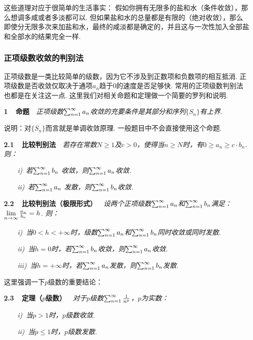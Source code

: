 这些道理对应于很简单的生活事实：
假如你拥有无限多的盐和水（条件收敛），那么想调多咸或者多淡都可以.
但如果盐和水的总量都是有限的（绝对收敛），那么即使分无限多次来加盐和水，最终的咸淡都是确定的，并且这与一次性加入全部盐和全部水的结果完全一样.

\subsubsection{正项级数收敛的判别法}

正项级数是一类比较简单的级数，因为它不涉及到正数项和负数项的相互抵消.
正项级数是否收敛仅取决于通项$a_n$趋于$0$的速度是否足够快.
常用的正项级数判别法也都是在关注这一点.
这里我们对相关命题和定理做一个简要的罗列和说明.\vspace{1em}

\textbf{1~~命题}~~\textit{正项级数$\ss a_n$收敛的充要条件是其部分和序列$\{ S_n \}$有上界.}\vspace{0.5em}

说明：对$\{ S_n \}$而言就是单调收敛原理. 一般题目中不会直接使用这个命题.    \vspace{1em}

\textbf{2.1~~比较判别法}~~\textit{若存在常数$N \ge 1$及$c > 0$，使得当$n \ge N$时，有$0 \ge a_n \ge c \cdot b_n$. 则：} \vspace{0.5em}

~~~~\textit{i)~若$\ss b_n$ 收敛，则$\ss a_n$收敛.}

~~~~\textit{ii)~若$\ss a_n$ 发散，则$\ss b_n$收敛.}\vspace{0.5em}

\textbf{2.2~~比较判别法（极限形式）}~~\textit{设两个正项级数$\ss a_n$和$\ss b_n$满足：$\limn \frac{a_n}{b_n} = h$. 则：}

~~~~\textit{i)~当$0 < h < +\infty$时，级数$\ss a_n$和$\ss b_n$同时收敛或同时发散.}

~~~~\textit{ii)~当$h=0$时，若$\ss b_n$收敛，则$\ss a_n$收敛.}

~~~~\textit{iii)~当$h = +\infty$时，若$\ss a_n$发散，则$\ss b_n$发散.} \vspace{1em}

这里强调一下$p$级数的重要结论：\vspace{0.5em}

\textbf{2.3~~定理（$p$级数）}~~\textit{对于$p$级数$\ss \frac{1}{n^p}$，$p$为实数：}

~~~~\textit{i)~当$p>1$时，$p$级数收敛.}

~~~~\textit{ii)~当$p \le 1$时，$p$级数发散.}\vspace{0.5em}

